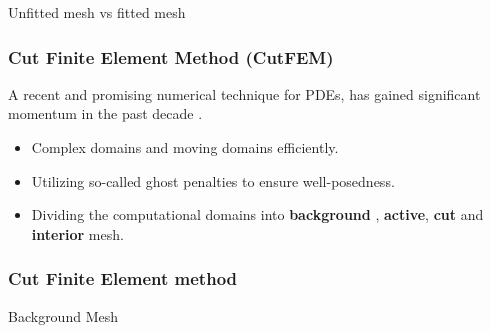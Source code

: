 \begin{frame}
\begin{block}{Unfitted mesh vs fitted mesh}
\begin{figure}
\begin{minipage}{0.45\textwidth}
    \end{minipage}


    \label{fig:domain_mesh}
    \end{figure}
\end{block}

\end{frame}


\begin{frame}
\frametitle{Cut Finite Element Method (CutFEM)}

A recent and promising numerical technique for PDEs, has gained significant momentum in the past decade \footnotemark[1]\footnotemark[2].

\begin{block}{}
    \begin{itemize}
        \item  Complex domains and moving domains efficiently.
        \item Utilizing so-called ghost penalties to ensure well-posedness.
        \item Dividing the computational domains into \textbf{background} , \textbf{active}, \textbf{cut}  and \textbf{interior} mesh.
    \end{itemize}
\end{block}

\end{frame}

\begin{frame}
    \frametitle{Cut Finite Element method}
Background Mesh
    \begin{block}{}
    \end{block}
\end{frame}


